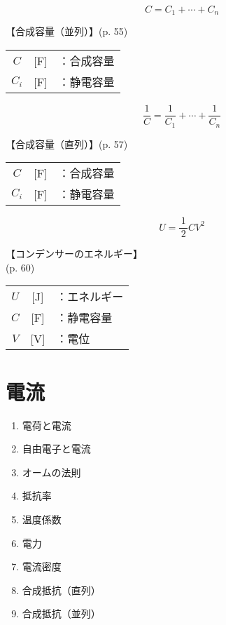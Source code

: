 \documentclass[10pt]{jarticle}
\begin{document}
\newpage
\[
C = C_1 + \cdots + C_n
\]


\vskip3mm
【合成容量（並列）】{\footnotesize (p. 55)}

\begin{tabular}{ccl}
$C$	&[F]	&：合成容量 \\
$C_i$	&[F]	&：静電容量 \\
\end{tabular}




\newpage
\[
\frac{1}{C} = \frac{1}{C_1} + \cdots + \frac{1}{C_n}
\]


\vskip3mm
【合成容量（直列）】{\footnotesize (p. 57)}

\begin{tabular}{ccl}
$C$	&[F]	&：合成容量 \\
$C_i$	&[F]	&：静電容量 \\
\end{tabular}



\newpage
\[
U = \frac{1}{\, 2 \,} C V^2
\]


\vskip3mm
【コンデンサーのエネルギー】\\
\hfill {\footnotesize (p. 60)}

\begin{tabular}{ccl}
$U$	&[J]	&：エネルギー \\
$C$	&[F]	&：静電容量 \\
$V$	&[V]	&：電位
\end{tabular}






\newpage
\addtocounter{page}{-1}
\thispagestyle{empty}
\section{電流}

\begin{enumerate}
\setcounter{enumi}{\thepage}
\small
\itemsep-4mm
\item 電荷と電流 \\
\item 自由電子と電流 \\
\item オームの法則 \\
\item 抵抗率 \\
\item 温度係数 \\
\item 電力 \\
\item 電流密度 \\
\item 合成抵抗（直列） \\
\item 合成抵抗（並列） \\
\end{enumerate}
\end{document}
